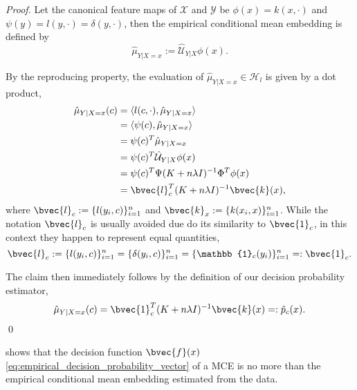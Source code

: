 \documentclass[runningheads, envcountsame, a4paper]{llncs}
\begin{document}
		\begin{proof}
			Let the canonical feature maps of $\mathcal{X}$ and $\mathcal{Y}$ be $\phi(x) = k(x, \cdot)$ and $\psi(y) = l(y, \cdot) = \delta(y, \cdot)$, then the empirical conditional mean embedding is defined by
			\begin{equation}
				\hat{\mu}_{Y | X = x} := \hat{\mathcal{U}}_{Y | X} \phi(x).
			\end{equation}
			
			By the reproducing property, the evaluation of $\hat{\mu}_{Y | X = x} \in \mathcal{H}_{l}$ is given by a dot product,
			\begin{equation}
			\begin{aligned}
				\hat{\mu}_{Y | X = x}(c) &= \langle l(c, \cdot), \hat{\mu}_{Y | X = x} \rangle \\
				&= \langle \psi(c), \hat{\mu}_{Y | X = x} \rangle \\
				&= \psi(c)^{T} \hat{\mu}_{Y | X = x} \\
				&= \psi(c)^{T} \hat{\mathcal{U}}_{Y | X} \phi(x) \\
				&= \psi(c)^{T} \Psi (K + n \lambda I)^{-1} \Phi^{T} \phi(x) \\
				&= \bvec{l}_{c}^{T} (K + n \lambda I)^{-1} \bvec{k}(x),
			\end{aligned}
			\end{equation}
			where $\bvec{l}_{c} := \{l(y_{i}, c)\}_{i = 1}^{n}$ and $\bvec{k}_{x} := \{k(x_{i}, x)\}_{i = 1}^{n}$. While the notation $\bvec{l}_{c}$ is usually avoided due do its similarity to $\bvec{1}_{c}$, in this context they happen to represent equal quantities,
			\begin{equation}
				\bvec{l}_{c} := \{l(y_{i}, c)\}_{i = 1}^{n} = \{\delta(y_{i}, c)\}_{i = 1}^{n} = \{\mathbb{1}_{c}(y_{i})\}_{i = 1}^{n} =: \bvec{1}_{c}.
			\end{equation}
			
			The claim then immediately follows by the definition of our decision probability estimator,
			\begin{equation}
				\hat{\mu}_{Y | X = x}(c) = \bvec{1}_{c}^{T} (K + n \lambda I)^{-1} \bvec{k}(x) =: \hat{p}_{c}(x).
			\end{equation}
			\qed
		\end{proof}
		
		 shows that the decision function $\bvec{f}(x)$ \eqref{eq:empirical_decision_probability_vector} of a \gls{MCE} is no more than the empirical conditional mean embedding estimated from the data.
		
\end{document}
